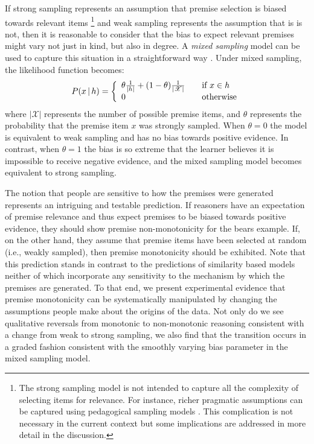 \documentclass[doc,12pt]{apa}
\newcommand{\given}{\, | \, } %
\newcommand{\bigx}{\mathscr{X}}
\begin{document}
If strong sampling represents an assumption that premise selection is biased towards relevant items%
\footnote{The strong sampling model is not intended to capture all the complexity of selecting items for relevance. For instance, richer pragmatic assumptions can be captured using pedagogical sampling models \cite{SGG14}. This complication is not necessary in the current context but some implications are addressed in more detail in the discussion.}
and weak sampling represents the assumption that is is not, then it is reasonable to consider that the bias to expect relevant premises might vary not just in kind, but also in degree. A {\it mixed sampling} model can be used to capture this situation in a straightforward way \cite{NDL12}. Under mixed sampling, the likelihood function becomes:
\begin{equation}
\label{eqn:mixedsampling}
P(x \given h) = \left\{
  \begin{array}{l l}
    \theta \frac{1}{|h|} + (1 - \theta) \frac{1}{|\bigx|} & \quad \textrm{if $x \in h$} \\
    0 & \quad \textrm{otherwise}
  \end{array} \right.
\end{equation}
where $|\bigx|$ represents the number of possible premise items, and $\theta$ represents the probability that the premise item $x$ was strongly sampled. When $\theta=0$ the model is equivalent to weak sampling and has no bias towards positive evidence. In contrast, when $\theta=1$ the bias is so extreme that the learner believes it is impossible to receive negative evidence, and the mixed sampling model becomes equivalent to strong sampling.

The notion that people are sensitive to how the premises were generated represents an intriguing and testable prediction.
If reasoners have an expectation of premise relevance and thus expect premises to be biased towards positive evidence, they should show premise non-monotonicity for the bears example.
%
If, on the other hand, they assume that premise items have been selected at random (i.e., weakly sampled), then premise monotonicity should be exhibited. Note that this prediction stands in contrast to the predictions of similarity based models \cite{Osh90,Slo93} neither of which incorporate any sensitivity to the mechanism by which the premises are generated. To that end, we present experimental evidence that premise monotonicity can be systematically manipulated by changing the assumptions people make about the origins of the data. Not only do we see qualitative reversals from monotonic to non-monotonic reasoning consistent with a change from weak to strong sampling, we also find that the transition occurs in a graded fashion consistent with the smoothly varying bias parameter in the mixed sampling model.
\end{document}
